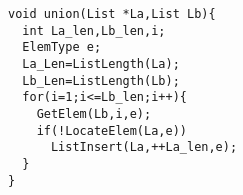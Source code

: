 \begin{lstlisting}[frame=tb,backgroundcolor=\color{red!10}]
void union(List *La,List Lb){
  int La_len,Lb_len,i;
  ElemType e;
  La_Len=ListLength(La);
  Lb_Len=ListLength(Lb);
  for(i=1;i<=Lb_len;i++){
    GetElem(Lb,i,e);
    if(!LocateElem(La,e))
      ListInsert(La,++La_len,e);
  }
} 
\end{lstlisting}
